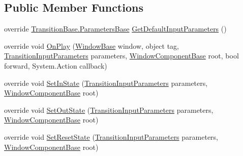 \subsection*{Public Member Functions}
\begin{DoxyCompactItemize}
\item 
override \hyperlink{class_unity_engine_1_1_u_i_1_1_windows_1_1_animations_1_1_transition_base_1_1_parameters_base}{Transition\+Base.\+Parameters\+Base} \hyperlink{class_unity_engine_1_1_u_i_1_1_windows_1_1_animations_1_1_window_animation_transition_alpha_acddbf0433b9f174223164a3b181930fd}{Get\+Default\+Input\+Parameters} ()
\item 
override void \hyperlink{class_unity_engine_1_1_u_i_1_1_windows_1_1_animations_1_1_window_animation_transition_alpha_ab262b8c070af598ef0d0deb91e0a1f64}{On\+Play} (\hyperlink{class_unity_engine_1_1_u_i_1_1_windows_1_1_window_base}{Window\+Base} window, object tag, \hyperlink{class_unity_engine_1_1_u_i_1_1_windows_1_1_animations_1_1_transition_input_parameters}{Transition\+Input\+Parameters} parameters, \hyperlink{class_unity_engine_1_1_u_i_1_1_windows_1_1_window_component_base}{Window\+Component\+Base} root, bool forward, System.\+Action callback)
\item 
override void \hyperlink{class_unity_engine_1_1_u_i_1_1_windows_1_1_animations_1_1_window_animation_transition_alpha_a733260136dc25913d753faa7e5020137}{Set\+In\+State} (\hyperlink{class_unity_engine_1_1_u_i_1_1_windows_1_1_animations_1_1_transition_input_parameters}{Transition\+Input\+Parameters} parameters, \hyperlink{class_unity_engine_1_1_u_i_1_1_windows_1_1_window_component_base}{Window\+Component\+Base} root)
\item 
override void \hyperlink{class_unity_engine_1_1_u_i_1_1_windows_1_1_animations_1_1_window_animation_transition_alpha_af319dd3ed9836bd1249cf33d04b5904a}{Set\+Out\+State} (\hyperlink{class_unity_engine_1_1_u_i_1_1_windows_1_1_animations_1_1_transition_input_parameters}{Transition\+Input\+Parameters} parameters, \hyperlink{class_unity_engine_1_1_u_i_1_1_windows_1_1_window_component_base}{Window\+Component\+Base} root)
\item 
override void \hyperlink{class_unity_engine_1_1_u_i_1_1_windows_1_1_animations_1_1_window_animation_transition_alpha_afe014e08d90a836508eea5d10783048b}{Set\+Reset\+State} (\hyperlink{class_unity_engine_1_1_u_i_1_1_windows_1_1_animations_1_1_transition_input_parameters}{Transition\+Input\+Parameters} parameters, \hyperlink{class_unity_engine_1_1_u_i_1_1_windows_1_1_window_component_base}{Window\+Component\+Base} root)
\end{DoxyCompactItemize}
